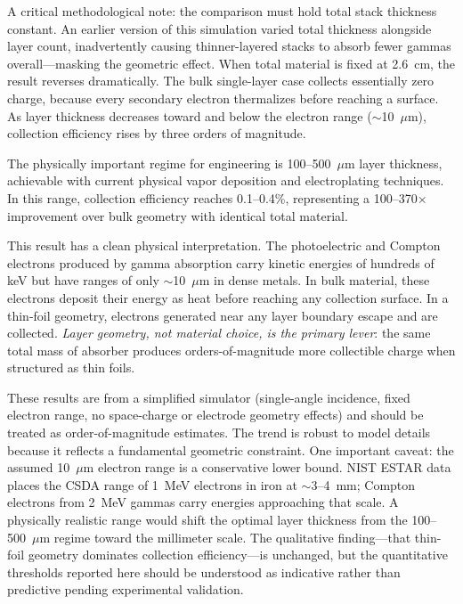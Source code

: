 \documentclass[12pt]{article}
\begin{document}
A critical methodological note: the comparison must hold total stack thickness constant.
An earlier version of this simulation varied total thickness alongside layer count,
inadvertently causing thinner-layered stacks to absorb fewer gammas overall---masking
the geometric effect. When total material is fixed at 2.6~cm, the result reverses
dramatically. The bulk single-layer case collects essentially zero charge, because
every secondary electron thermalizes before reaching a surface. As layer thickness
decreases toward and below the electron range ($\sim$10~$\mu$m), collection efficiency
rises by three orders of magnitude.

The physically important regime for engineering is 100--500~$\mu$m layer thickness,
achievable with current physical vapor deposition and electroplating techniques. In this
range, collection efficiency reaches 0.1--0.4\%, representing a 100--370$\times$
improvement over bulk geometry with identical total material.

This result has a clean physical interpretation. The photoelectric and Compton electrons
produced by gamma absorption carry kinetic energies of hundreds of keV but have ranges
of only $\sim$10~$\mu$m in dense metals. In bulk material, these electrons deposit their
energy as heat before reaching any collection surface. In a thin-foil geometry,
electrons generated near any layer boundary escape and are collected. \emph{Layer
geometry, not material choice, is the primary lever}: the same total mass of absorber
produces orders-of-magnitude more collectible charge when structured as thin foils.

These results are from a simplified simulator (single-angle incidence, fixed electron
range, no space-charge or electrode geometry effects) and should be treated as
order-of-magnitude estimates. The trend is robust to model details because it reflects
a fundamental geometric constraint. One important caveat: the assumed 10~$\mu$m electron
range is a conservative lower bound. NIST ESTAR data places the CSDA range of 1~MeV
electrons in iron at $\sim$3--4~mm; Compton electrons from 2~MeV gammas carry energies
approaching that scale. A physically realistic range would shift the optimal layer
thickness from the 100--500~$\mu$m regime toward the millimeter scale. The qualitative
finding---that thin-foil geometry dominates collection efficiency---is unchanged, but
the quantitative thresholds reported here should be understood as indicative rather
than predictive pending experimental validation.
\end{document}
